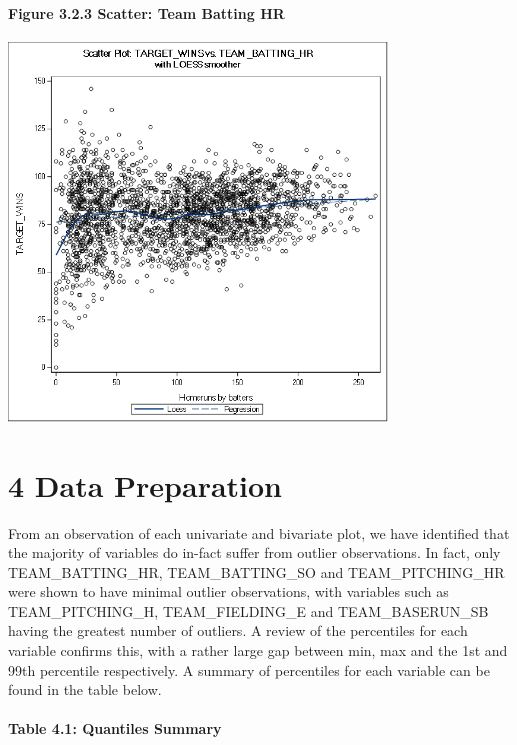 \documentclass[]{article}
\let\oldparagraph\paragraph
\renewcommand{\paragraph}[1]{\oldparagraph{#1}\mbox{}}
\begin{document}
\paragraph{Figure 3.2.3 Scatter: Team Batting
HR}\label{figure-3.2.3-scatter-team-batting-hr}

\includegraphics[height=3.95833in]{images/scatter_team_batting_hr.png}

\section{4 Data Preparation}\label{data-preparation}

From an observation of each univariate and bivariate plot, we have
identified that the majority of variables do in-fact suffer from outlier
observations. In fact, only TEAM\_BATTING\_HR, TEAM\_BATTING\_SO and
TEAM\_PITCHING\_HR were shown to have minimal outlier observations, with
variables such as TEAM\_PITCHING\_H, TEAM\_FIELDING\_E and
TEAM\_BASERUN\_SB having the greatest number of outliers. A review of
the percentiles for each variable confirms this, with a rather large gap
between min, max and the 1st and 99th percentile respectively. A summary
of percentiles for each variable can be found in the table below.

\paragraph{Table 4.1: Quantiles
Summary}\label{table-4.1-quantiles-summary}
\end{document}
